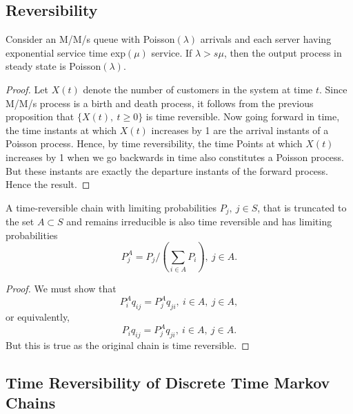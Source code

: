 \documentclass[a4paper,10pt,english]{article}
\begin{document}
\subsection{Reversibility}
\begin{cor}
Consider an M/M/s queue with Poisson$(\lambda)$ arrivals and each server having exponential service time exp$(\mu)$ service. If $\lambda > s \mu$, then the output process in steady state is Poisson$(\lambda)$.
\end{cor}
\begin{proof}
Let $X(t)$ denote the number of customers in the system at time $t$. Since M/M/s process is a birth and death process, it follows from the previous proposition that $\{X(t),~t \geq 0\}$ is time reversible. Now going forward in time, the time instants at which $X(t)$ increases by 1 are the arrival instants of a Poisson process. Hence, by time reversibility, the time Points at which $X(t)$ increases by 1 when we go backwards in time also constitutes a Poisson process. But these instants are exactly the departure instants of the forward process. Hence the result.
\end{proof}
\begin{prop}
A time-reversible chain with limiting probabilities $P_j,~ j \in S$, that is truncated to the set $A\subset S$ and remains irreducible is also time reversible and has limiting probabilities 
\begin{equation}
P_j^A=P_j/(\sum_{i \in A}P_i),~ j \in A.
\end{equation}
\end{prop}
\begin{proof}
We must show that 
\begin{equation*}
P_i^Aq_{ij}=P_j^Aq_{ji},~ i \in A,~ j \in A,
\end{equation*}
or equivalently,
\begin{equation*}
P_iq_{ij}=P_j^Aq_{ji},~ i \in A,~ j \in A.
\end{equation*}
But this is true as the original chain is time reversible.
\end{proof}


\subsection{Time Reversibility of Discrete Time Markov Chains}
\end{document}

